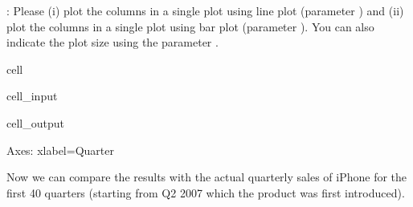 \documentclass[letterpaper,10pt,english]{jupyterBook}
\begin{document}
\sphinxAtStartPar
{}: Please (i) plot the columns \sphinxcode{\sphinxupquote{{[}'ft','Ft'{]}}} in a single plot using line plot (parameter ) and (ii) plot the columns \sphinxcode{\sphinxupquote{{[}'st','St'{]}}} in a single plot using bar plot (parameter ). You can also indicate the plot size using the parameter .

\begin{sphinxuseclass}{cell}\begin{sphinxVerbatimInput}

\begin{sphinxuseclass}{cell_input}
\begin{sphinxVerbatim}[commandchars=\\\{\}]
\PYG{p}{[}\PYG{p}{[}\PYG{p}{]}\PYG{p}{]}  
\PYG{p}{[}\PYG{p}{[}\PYG{p}{]}\PYG{p}{]}     
\end{sphinxVerbatim}

\end{sphinxuseclass}\end{sphinxVerbatimInput}
\begin{sphinxVerbatimOutput}

\begin{sphinxuseclass}{cell_output}
\begin{sphinxVerbatim}[commandchars=\\\{\}]
\PYGZlt{}Axes: xlabel=\PYGZsq{}Quarter\PYGZsq{}\PYGZgt{}
\end{sphinxVerbatim}

\noindent{}

\noindent{}

\end{sphinxuseclass}\end{sphinxVerbatimOutput}

\end{sphinxuseclass}
\sphinxAtStartPar
Now we can compare the results with the actual quarterly sales of iPhone for the first 40 quarters (starting from Q2 2007 which the product was first introduced).
\end{document}

